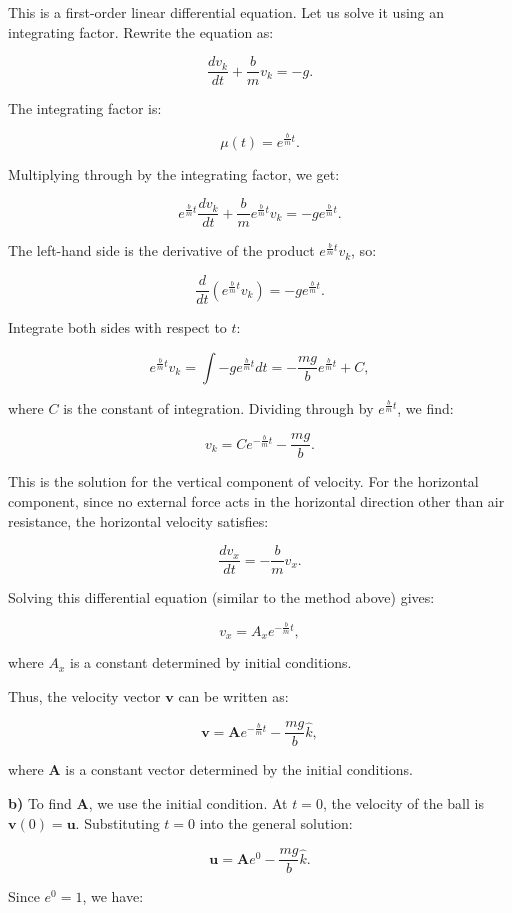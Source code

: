 This is a first-order linear differential equation. Let us solve it using an integrating factor. Rewrite the equation as:

\[
\frac{d v_k}{dt} + \frac{b}{m} v_k = -g.
\]

The integrating factor is:

\[
\mu(t) = e^{\frac{b}{m}t}.
\]

Multiplying through by the integrating factor, we get:

\[
e^{\frac{b}{m}t} \frac{d v_k}{dt} + \frac{b}{m} e^{\frac{b}{m}t} v_k = -g e^{\frac{b}{m}t}.
\]

The left-hand side is the derivative of the product $e^{\frac{b}{m}t} v_k$, so:

\[
\frac{d}{dt} \left( e^{\frac{b}{m}t} v_k \right) = -g e^{\frac{b}{m}t}.
\]

Integrate both sides with respect to $t$:

\[
e^{\frac{b}{m}t} v_k = \int -g e^{\frac{b}{m}t} dt = -\frac{mg}{b} e^{\frac{b}{m}t} + C,
\]

where $C$ is the constant of integration. Dividing through by $e^{\frac{b}{m}t}$, we find:

\[
v_k = C e^{-\frac{b}{m}t} - \frac{mg}{b}.
\]

This is the solution for the vertical component of velocity. For the horizontal component, since no external force acts in the horizontal direction other than air resistance, the horizontal velocity satisfies:

\[
\frac{d v_x}{dt} = -\frac{b}{m} v_x.
\]

Solving this differential equation (similar to the method above) gives:

\[
v_x = A_x e^{-\frac{b}{m}t},
\]

where $A_x$ is a constant determined by initial conditions.

Thus, the velocity vector $\mathbf{v}$ can be written as:

\[
\mathbf{v} = \mathbf{A} e^{-\frac{b}{m}t} - \frac{mg}{b} \hat{k},
\]

where $\mathbf{A}$ is a constant vector determined by the initial conditions.

\textbf{b)} To find $\mathbf{A}$, we use the initial condition. At $t = 0$, the velocity of the ball is $\mathbf{v}(0) = \mathbf{u}$. Substituting $t = 0$ into the general solution:

\[
\mathbf{u} = \mathbf{A} e^{0} - \frac{mg}{b} \hat{k}.
\]

Since $e^{0} = 1$, we have:

